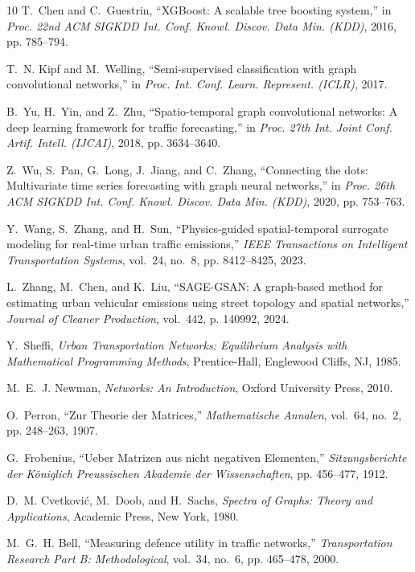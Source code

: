 \documentclass[journal]{IEEEtran}
\begin{document}
\begin{thebibliography}{10}
T.~Chen and C.~Guestrin, ``XGBoost: A scalable tree boosting system,'' in \emph{Proc. 22nd ACM SIGKDD Int. Conf. Knowl. Discov. Data Min. (KDD)}, 2016, pp. 785--794.

T.~N. Kipf and M.~Welling, ``Semi-supervised classification with graph convolutional networks,'' in \emph{Proc. Int. Conf. Learn. Represent. (ICLR)}, 2017.

B.~Yu, H.~Yin, and Z.~Zhu, ``Spatio-temporal graph convolutional networks: A deep learning framework for traffic forecasting,'' in \emph{Proc. 27th Int. Joint Conf. Artif. Intell. (IJCAI)}, 2018, pp. 3634--3640.

Z.~Wu, S.~Pan, G.~Long, J.~Jiang, and C.~Zhang, ``Connecting the dots: Multivariate time series forecasting with graph neural networks,'' in \emph{Proc. 26th ACM SIGKDD Int. Conf. Knowl. Discov. Data Min. (KDD)}, 2020, pp. 753--763.

Y.~Wang, S.~Zhang, and H.~Sun, ``Physics-guided spatial-temporal surrogate modeling for real-time urban traffic emissions,'' \emph{IEEE Transactions on Intelligent Transportation Systems}, vol.~24, no.~8, pp. 8412--8425, 2023.

L.~Zhang, M.~Chen, and K.~Liu, ``SAGE-GSAN: A graph-based method for estimating urban vehicular emissions using street topology and spatial networks,'' \emph{Journal of Cleaner Production}, vol.~442, p. 140992, 2024.

Y.~Sheffi, \emph{Urban Transportation Networks: Equilibrium Analysis with Mathematical Programming Methods}, Prentice-Hall, Englewood Cliffs, NJ, 1985.

M.~E.~J. Newman, \emph{Networks: An Introduction}, Oxford University Press, 2010.

O.~Perron, ``Zur Theorie der Matrices,'' \emph{Mathematische Annalen}, vol.~64, no.~2, pp. 248--263, 1907.

G.~Frobenius, ``Ueber Matrizen aus nicht negativen Elementen,'' \emph{Sitzungsberichte der K{\"o}niglich Preussischen Akademie der Wissenschaften}, pp. 456--477, 1912.

D.~M. Cvetkovi{\'c}, M.~Doob, and H.~Sachs, \emph{Spectra of Graphs: Theory and Applications}, Academic Press, New York, 1980.

M.~G.~H. Bell, ``Measuring defence utility in traffic networks,'' \emph{Transportation Research Part B: Methodological}, vol.~34, no.~6, pp. 465--478, 2000.


\end{thebibliography}
\end{document}
